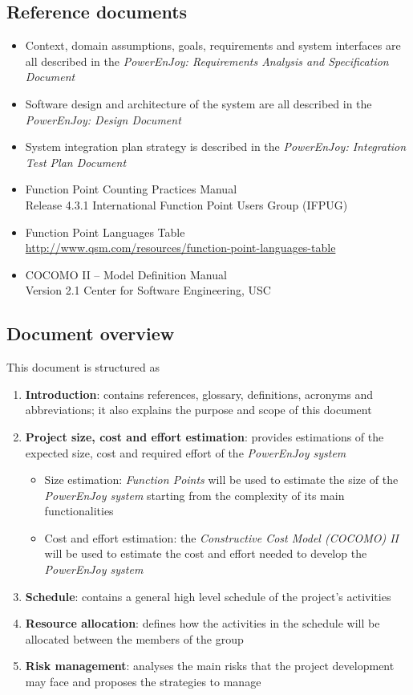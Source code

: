 \subsection{Reference documents}
\begin{itemize}
	\item Context, domain assumptions, goals, requirements and system interfaces are all described in the \emph{PowerEnJoy: Requirements Analysis and Specification Document} \cite{RASD}
	\item Software design and architecture of the system are all described in the \emph{PowerEnJoy: Design Document} \cite{DD}
	\item System integration plan strategy is described in the \emph{PowerEnJoy: Integration Test Plan Document} \cite{ITPD}
	\item Function Point Counting Practices Manual \\ 
Release 4.3.1 International Function Point Users Group (IFPUG)
	\item Function Point Languages Table \\ 
\url{http://www.qsm.com/resources/function-point-languages-table}
	\item COCOMO II – Model Definition Manual \\
Version 2.1 Center for Software Engineering, USC

\end{itemize}


\subsection{Document overview}
This document is structured as
\begin{enumerate}
	\item \textbf{Introduction}: contains references, glossary, definitions, acronyms and abbreviations; it also explains the purpose and scope of this document
	\item \textbf{Project size, cost and effort estimation}: provides estimations of the expected size, cost and required effort of the \emph{PowerEnJoy system}
	\begin{itemize}
		\item Size estimation: \emph{Function Points} will be used to estimate the size of the \emph{PowerEnJoy system} starting from the complexity of its main functionalities
		\item Cost and effort estimation: the \emph{Constructive Cost Model (COCOMO) II} will be used to estimate the cost and effort needed to develop the \emph{PowerEnJoy system}
	\end{itemize}
	\item \textbf{Schedule}: contains a general high level schedule of the project's activities
	\item \textbf{Resource allocation}: defines how the activities in the schedule will be allocated between the members of the group
	\item \textbf{Risk management}: analyses the main risks that the project development may face and proposes the strategies to manage 
\end{enumerate}
